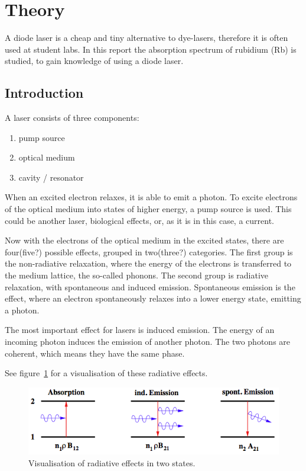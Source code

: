 \section{Theory}\label{theory}

A diode laser is a cheap and tiny alternative to dye-lasers, therefore it is often used at student
labs.
In this report the absorption spectrum of rubidium (Rb) is studied, to gain knowledge of using
a diode laser.

\subsection{Introduction}\label{introduction}

A laser consists of three components:

\begin{enumerate}
  \item pump source
  \item optical medium
  \item cavity / resonator
\end{enumerate}

When an excited electron relaxes, it is able to emit a photon.
To excite electrons of the optical medium into states of higher energy, a pump source is used.
This could be another laser, biological effects, or, as it is in this case, a current.

Now with the electrons of the optical medium in the excited states, there are four(five?) possible
effects, grouped in two(three?) categories.
The first group is the non-radiative relaxation, where the energy of the electrons is transferred
to the medium lattice, the so-called phonons.
The second group is radiative relaxation, with spontaneous and induced emission.
Spontaneous emission is the effect, where an electron spontaneously relaxes into a lower energy
state, emitting a photon.

The most important effect for lasers is induced emission.
The energy of an incoming photon induces the emission of another photon.
The two photons are coherent, which means they have the same phase.

See figure~\ref{fig:two_niveau_laser} for a visualisation of these radiative effects.
\begin{figure}[ht]
  \centering
  \includegraphics[width=0.8\linewidth]{content/zweiniveausystem.png}
  \caption{Visualisation of radiative effects in two states\cite{anleitung_hene}.}%
  \label{fig:two_niveau_laser}
\end{figure}


